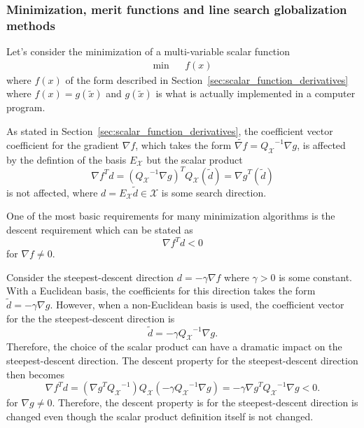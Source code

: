 \subsubsection{Minimization, merit functions and line search globalization methods}

Let's consider the minimization of a multi-variable scalar function
%
\begin{eqnarray}
\mbox{min} & & f(x)
\end{eqnarray}
%
where $f(x)$ of the form described in
Section~\ref{sec:scalar_function_derivatives} where $f(x) = g(\tilde{x})$ and
$g(\tilde{x})$ is what is actually implemented in a computer program.

As stated in Section~\ref{sec:scalar_function_derivatives}, the coefficient
vector coefficient for the gradient $\nabla f$, which takes the form
$\tilde{\nabla f} = {Q_{\mathcal{X}}}^{-1} {}\nabla g$, is affected by the
defintion of the basis $E_{\mathcal{X}}$ but the scalar product
%
\begin{equation}
{\nabla f}^T d
= ({Q_{\mathcal{X}}}^{-1} {}\nabla g)^T Q_{\mathcal{X}} (\tilde{d})
 = {\nabla g}^T (\tilde{d})
\label{eqn:descent_inner_prod}
\end{equation}
%
is not affected, where $d=E_{\mathcal{X}}\tilde{d}\in\mathcal{X}$ is some
search direction.

One of the most basic requirements for many minimization algorithms is the
descent requirement which can be stated as
%
\begin{equation}
{\nabla f}^T d < 0
\label{eqn:descent_condition}
\end{equation}
%
for $\nabla f {}\ne 0$.

Consider the steepest-descent direction $d = -{}\gamma\nabla f$ where $\gamma
>0$ is some constant.  With a Euclidean basis, the coefficients for this
direction takes the form $\tilde{d} = -{}\gamma\nabla g$.  However, when a
non-Euclidean basis is used, the coefficient vector for the the
steepest-descent direction is
%
\[
\tilde{d} = - \gamma {Q_{\mathcal{X}}}^{-1} \nabla g. 
\]
%
Therefore, the choice of the scalar product can have a dramatic impact on the
steepest-descent direction.  The descent property for the steepest-descent direction then
becomes
%
\[
{\nabla f}^T d
= ( {\nabla g}^T {Q_{\mathcal{X}}}^{-1}) Q_{\mathcal{X}} (-\gamma {Q_{\mathcal{X}}}^{-1} \nabla g)
= -\gamma {\nabla g}^T {Q_{\mathcal{X}}}^{-1} \nabla g < 0.
\]
%
for $\nabla g {}\ne 0$.  Therefore, the descent property is for the
steepest-descent direction is changed even though the scalar product
definition itself is not changed.

